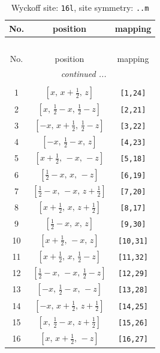 \documentclass[fleqn,8pt]{jsarticle}
\begin{document}
\renewcommand{\arraystretch}{1.2}
\begin{longtable}{ccc}
\caption{Wyckoff site: {\tt 16l}, site symmetry: {\tt ..m}}
 \\
 \hline \hline
No. & position & mapping \\ \hline \endfirsthead

\multicolumn{2}{l}{\tablename\ \thetable{}} \\
 \hline \hline
No. & position & mapping \\ \hline \endhead

 \hline \hline
\multicolumn{2}{r}{\footnotesize\it continued ...} \\ \endfoot

 \hline \hline
\multicolumn{2}{r}{} \\ \endlastfoot

1 & $\left[ x,\, x + \frac{1}{2},\, z \right]$ & {\tt [1,24]} \\ \hline
2 & $\left[ x,\, \frac{1}{2} - x,\, \frac{1}{2} - z \right]$ & {\tt [2,21]} \\ \hline
3 & $\left[ - x,\, x + \frac{1}{2},\, \frac{1}{2} - z \right]$ & {\tt [3,22]} \\ \hline
4 & $\left[ - x,\, \frac{1}{2} - x,\, z \right]$ & {\tt [4,23]} \\ \hline
5 & $\left[ x + \frac{1}{2},\, - x,\, - z \right]$ & {\tt [5,18]} \\ \hline
6 & $\left[ \frac{1}{2} - x,\, x,\, - z \right]$ & {\tt [6,19]} \\ \hline
7 & $\left[ \frac{1}{2} - x,\, - x,\, z + \frac{1}{2} \right]$ & {\tt [7,20]} \\ \hline
8 & $\left[ x + \frac{1}{2},\, x,\, z + \frac{1}{2} \right]$ & {\tt [8,17]} \\ \hline
9 & $\left[ \frac{1}{2} - x,\, x,\, z \right]$ & {\tt [9,30]} \\ \hline
10 & $\left[ x + \frac{1}{2},\, - x,\, z \right]$ & {\tt [10,31]} \\ \hline
11 & $\left[ x + \frac{1}{2},\, x,\, \frac{1}{2} - z \right]$ & {\tt [11,32]} \\ \hline
12 & $\left[ \frac{1}{2} - x,\, - x,\, \frac{1}{2} - z \right]$ & {\tt [12,29]} \\ \hline
13 & $\left[ - x,\, \frac{1}{2} - x,\, - z \right]$ & {\tt [13,28]} \\ \hline
14 & $\left[ - x,\, x + \frac{1}{2},\, z + \frac{1}{2} \right]$ & {\tt [14,25]} \\ \hline
15 & $\left[ x,\, \frac{1}{2} - x,\, z + \frac{1}{2} \right]$ & {\tt [15,26]} \\ \hline
16 & $\left[ x,\, x + \frac{1}{2},\, - z \right]$ & {\tt [16,27]} \\
\end{longtable}
\end{document}
